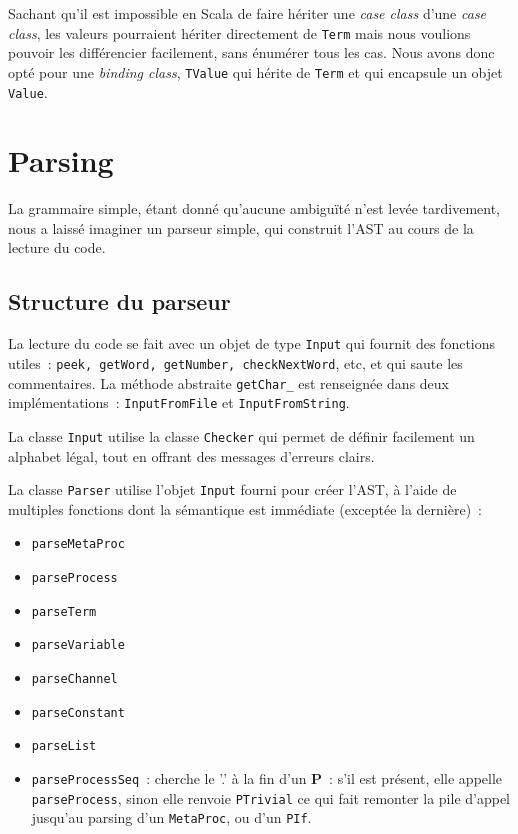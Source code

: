 \documentclass[11pt]{article} %
\begin{document}
Sachant qu'il est impossible en Scala de faire hériter une \emph{case class} d'une \emph{case class}, les valeurs pourraient hériter directement de \texttt{Term} mais nous voulions pouvoir les différencier facilement, sans énumérer tous les cas. Nous avons donc opté pour une \emph{binding class}, \texttt{TValue} qui hérite de \texttt{Term} et qui encapsule un objet \texttt{Value}.

\section{Parsing}

La grammaire simple, étant donné qu'aucune ambiguïté n'est levée tardivement, nous a laissé imaginer un parseur simple, qui construit l'AST au cours de la lecture du code.

\subsection{Structure du parseur}

La lecture du code se fait avec un objet de type \texttt{Input} qui fournit des fonctions utiles~: \texttt{peek, getWord, getNumber, checkNextWord}, etc, et qui saute les commentaires.
La méthode abstraite \texttt{getChar\_} est renseignée dans deux implémentations~: \texttt{InputFromFile} et \texttt{InputFromString}.

La classe \texttt{Input} utilise la classe \texttt{Checker} qui permet de définir facilement un alphabet légal, tout en  offrant des messages d'erreurs clairs.

La classe \texttt{Parser} utilise l'objet \texttt{Input} fourni pour créer l'AST, à l'aide de multiples fonctions dont la sémantique est immédiate (exceptée la dernière)~: 
\begin{itemize}
\item \texttt{parseMetaProc} 
\item \texttt{parseProcess}
\item \texttt{parseTerm}
\item \texttt{parseVariable}
\item \texttt{parseChannel}
\item \texttt{parseConstant}
\item \texttt{parseList}
\item \texttt{parseProcessSeq}~: cherche le '.' à la fin d'un \textbf{P}~: s'il est présent, elle appelle \texttt{parseProcess}, sinon elle renvoie \texttt{PTrivial} ce qui fait remonter la pile d'appel jusqu'au parsing d'un \texttt{MetaProc}, ou d'un \texttt{PIf}.
\end{itemize}
\end{document}
